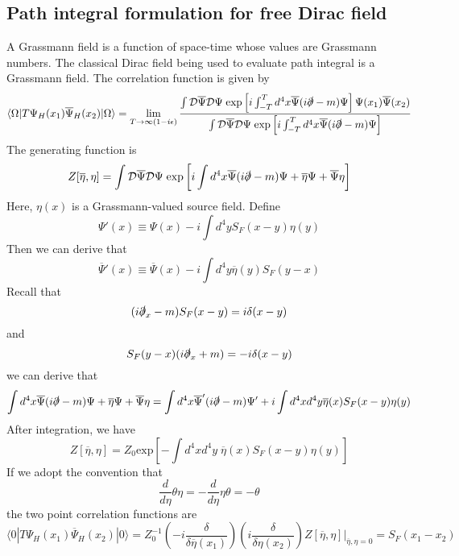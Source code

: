 \documentclass[cyan]{elegantnote}
\begin{document}
\subsection{Path integral formulation for free Dirac field}
A Grassmann field is a function of space-time whose values are Grassmann numbers. The classical Dirac field being used to evaluate path integral is a Grassmann field. The correlation function is given by
\[\langle \Omega | T \Psi_H(x_1) \overline{\Psi}_H(x_2)| \Omega \rangle = \lim_{T \to \infty(1-i\epsilon)} \frac{\int \mathcal{D}\overline{\Psi} \mathcal{D}\Psi \; \mathrm{exp} \left[ i\int_{-T}^T d^4x \overline{\Psi}(i\slashed{\partial}-m)\Psi \right] \Psi(x_1) \overline{\Psi}(x_2)}{\int \mathcal{D}\overline{\Psi} \mathcal{D}\Psi \; \mathrm{exp} \left[ i\int_{-T}^T d^4x \overline{\Psi}(i\slashed{\partial}-m)\Psi \right]}\]
The generating function is 
\[Z[\overline{\eta},\eta] = \int \mathcal{D}\overline{\Psi} \mathcal{D}\Psi \; \mathrm{exp} \left[ i\int d^4x \overline{\Psi}(i\slashed{\partial}-m)\Psi + \overline{\eta}\Psi + \overline{\Psi}\eta \right]\]
Here, $\eta(x)$ is a Grassmann-valued source field. 
Define
\[\Psi'(x) \equiv \Psi(x) - i \int d^4y S_F(x-y)\eta(y)\]
Then we can derive that
\[\overline{\Psi}'(x) \equiv \overline{\Psi}(x) - i \int d^4y \overline{\eta}(y)S_F(y-x)\]
Recall that
\[(i\slashed{\partial}_x-m)S_F(x-y) = i\delta(x-y)\]
and
\[S_F(y-x)(i \slashed{\partial}_x+m) = -i\delta(x-y)\]
we can derive that
\[\int d^4x \overline{\Psi}(i\slashed{\partial}-m)\Psi + \overline{\eta}\Psi + \overline{\Psi}\eta = \int d^4x \overline{\Psi}'(i\slashed{\partial}-m)\Psi' + i \int d^4x d^4y \overline{\eta}(x)S_F(x-y)\eta(y) \]
After integration, we have
\[Z[\overline{\eta},\eta] = Z_0 \mathrm{exp} \left[ -\int d^4x d^4y \; \overline{\eta}(x)S_F(x-y)\eta(y) \right]\]
If we adopt the convention that
\[\frac{d}{d\eta} \theta \eta = - \frac{d}{d\eta} \eta \theta = - \theta\]
the two point correlation functions are
\[\langle 0 | T \Psi_H(x_1) \overline{\Psi}_H(x_2)| 0 \rangle = Z_0^{-1} \left(-i \frac{\delta}{\delta \overline{\eta}(x_1)} \right) \left(i \frac{\delta}{\delta \eta(x_2)} \right) Z[\overline{\eta},\eta]|_{\overline{\eta},\eta=0} = S_F(x_1-x_2) \]
\end{document}

